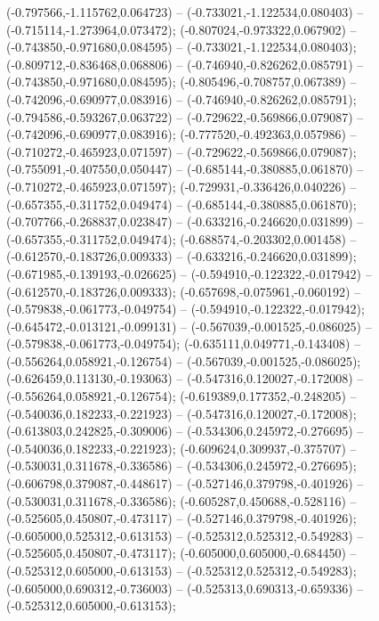  (-0.797566,-1.115762,0.064723) -- (-0.733021,-1.122534,0.080403) -- (-0.715114,-1.273964,0.073472);
 (-0.807024,-0.973322,0.067902) -- (-0.743850,-0.971680,0.084595) -- (-0.733021,-1.122534,0.080403);
 (-0.809712,-0.836468,0.068806) -- (-0.746940,-0.826262,0.085791) -- (-0.743850,-0.971680,0.084595);
 (-0.805496,-0.708757,0.067389) -- (-0.742096,-0.690977,0.083916) -- (-0.746940,-0.826262,0.085791);
 (-0.794586,-0.593267,0.063722) -- (-0.729622,-0.569866,0.079087) -- (-0.742096,-0.690977,0.083916);
 (-0.777520,-0.492363,0.057986) -- (-0.710272,-0.465923,0.071597) -- (-0.729622,-0.569866,0.079087);
 (-0.755091,-0.407550,0.050447) -- (-0.685144,-0.380885,0.061870) -- (-0.710272,-0.465923,0.071597);
 (-0.729931,-0.336426,0.040226) -- (-0.657355,-0.311752,0.049474) -- (-0.685144,-0.380885,0.061870);
 (-0.707766,-0.268837,0.023847) -- (-0.633216,-0.246620,0.031899) -- (-0.657355,-0.311752,0.049474);
 (-0.688574,-0.203302,0.001458) -- (-0.612570,-0.183726,0.009333) -- (-0.633216,-0.246620,0.031899);
 (-0.671985,-0.139193,-0.026625) -- (-0.594910,-0.122322,-0.017942) -- (-0.612570,-0.183726,0.009333);
 (-0.657698,-0.075961,-0.060192) -- (-0.579838,-0.061773,-0.049754) -- (-0.594910,-0.122322,-0.017942);
 (-0.645472,-0.013121,-0.099131) -- (-0.567039,-0.001525,-0.086025) -- (-0.579838,-0.061773,-0.049754);
 (-0.635111,0.049771,-0.143408) -- (-0.556264,0.058921,-0.126754) -- (-0.567039,-0.001525,-0.086025);
 (-0.626459,0.113130,-0.193063) -- (-0.547316,0.120027,-0.172008) -- (-0.556264,0.058921,-0.126754);
 (-0.619389,0.177352,-0.248205) -- (-0.540036,0.182233,-0.221923) -- (-0.547316,0.120027,-0.172008);
 (-0.613803,0.242825,-0.309006) -- (-0.534306,0.245972,-0.276695) -- (-0.540036,0.182233,-0.221923);
 (-0.609624,0.309937,-0.375707) -- (-0.530031,0.311678,-0.336586) -- (-0.534306,0.245972,-0.276695);
 (-0.606798,0.379087,-0.448617) -- (-0.527146,0.379798,-0.401926) -- (-0.530031,0.311678,-0.336586);
 (-0.605287,0.450688,-0.528116) -- (-0.525605,0.450807,-0.473117) -- (-0.527146,0.379798,-0.401926);
 (-0.605000,0.525312,-0.613153) -- (-0.525312,0.525312,-0.549283) -- (-0.525605,0.450807,-0.473117);
 (-0.605000,0.605000,-0.684450) -- (-0.525312,0.605000,-0.613153) -- (-0.525312,0.525312,-0.549283);
 (-0.605000,0.690312,-0.736003) -- (-0.525313,0.690313,-0.659336) -- (-0.525312,0.605000,-0.613153);

